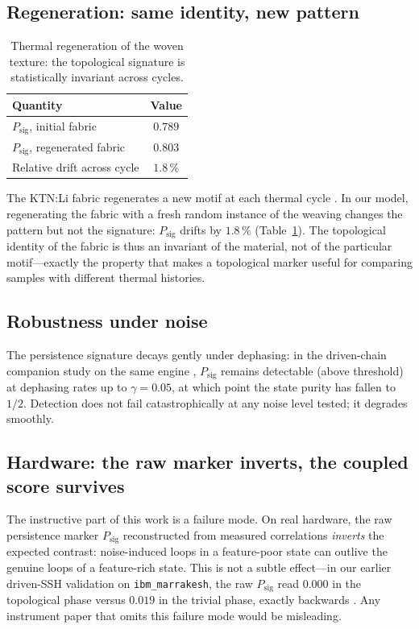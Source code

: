 \documentclass[11pt]{article}
\begin{document}
\subsection{Regeneration: same identity, new pattern}

\begin{table}[t]
\centering
\caption{Thermal regeneration of the woven texture: the topological
signature is statistically invariant across cycles.}
\label{tab:regen}
\begin{tabular}{lc}
\toprule
Quantity & Value\\
\midrule
$P_{\mathrm{sig}}$, initial fabric & $0.789$\\
$P_{\mathrm{sig}}$, regenerated fabric & $0.803$\\
Relative drift across cycle & $1.8\,\%$\\
\bottomrule
\end{tabular}
\end{table}

The KTN:Li fabric regenerates a new motif at each thermal cycle
\cite{Xin2026}. In our model, regenerating the fabric with a fresh random
instance of the weaving changes the pattern but not the signature:
$P_{\mathrm{sig}}$ drifts by $1.8\,\%$ (Table~\ref{tab:regen}). The
topological identity of the fabric is thus an invariant of the material,
not of the particular motif---exactly the property that makes a topological
marker useful for comparing samples with different thermal histories.

\subsection{Robustness under noise}

The persistence signature decays gently under dephasing: in the driven-chain
companion study on the same engine \cite{repo}, $P_{\mathrm{sig}}$ remains
detectable (above threshold) at dephasing rates up to $\gamma = 0.05$, at
which point the state purity has fallen to $1/2$. Detection does not fail
catastrophically at any noise level tested; it degrades smoothly.

\subsection{Hardware: the raw marker inverts, the coupled score survives}
\label{sec:qpu}

The instructive part of this work is a failure mode. On real hardware, the
raw persistence marker $P_{\mathrm{sig}}$ reconstructed from measured
correlations \emph{inverts} the expected contrast: noise-induced loops in a
feature-poor state can outlive the genuine loops of a feature-rich state.
This is not a subtle effect---in our earlier driven-SSH validation on
\texttt{ibm\_marrakesh}, the raw $P_{\mathrm{sig}}$ read $0.000$ in the
topological phase versus $0.019$ in the trivial phase, exactly backwards
\cite{repo}. Any instrument paper that omits this failure mode would be
misleading.
\end{document}
